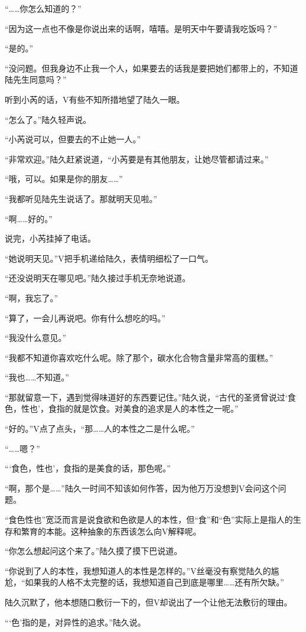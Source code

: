 “……你怎么知道的？”

“因为这一点也不像是你说出来的话啊，嘻嘻。是明天中午要请我吃饭吗？”

“是的。”

“没问题。但我身边不止我一个人，如果要去的话我是要把她们都带上的，不知道陆先生同意吗？”

听到小芮的话，V有些不知所措地望了陆久一眼。

“怎么了。”陆久轻声说。

“小芮说可以，但要去的不止她一人。”

“非常欢迎。”陆久赶紧说道，“小芮要是有其他朋友，让她尽管都请过来。”

“哦，可以。如果是你的朋友……”

“我都听见陆先生说话了。那就明天见啦。”

“啊……好的。”

说完，小芮挂掉了电话。

“她说明天见。”V把手机递给陆久，表情明细松了一口气。

“还没说明天在哪见吧。”陆久接过手机无奈地说道。

“啊，我忘了。”

“算了，一会儿再说吧。你有什么想吃的吗。”

“我没什么意见。” 

“我都不知道你喜欢吃什么呢。除了那个，碳水化合物含量非常高的蛋糕。”

“我也……不知道。”

“那就留意一下，遇到觉得味道好的东西要记住。”陆久说，“古代的圣贤曾说过‘食色，性也’，食指的就是饮食。对美食的追求是人的本性之一呢。”

“好的。”V点了点头，“那……人的本性之二是什么呢。”

“……嗯？”

“‘食色，性也’，食指的是美食的话，那色呢。”

“啊，那个是……”陆久一时间不知该如何作答，因为他万万没想到V会问这个问题。

“食色性也”宽泛而言是说食欲和色欲是人的本性，但“食”和“色”实际上是指人的生存和繁育的本能。这种抽象的东西该怎么向V解释呢。

“你怎么想起问这个来了。”陆久摸了摸下巴说道。

“你说到了人的本性，我想知道人的本性是怎样的。”V丝毫没有察觉陆久的尴尬，“如果我的人格不太完整的话，我想知道自己到底是哪里……还有所欠缺。”

陆久沉默了，他本想随口敷衍一下的，但V却说出了一个让他无法敷衍的理由。

“‘色’指的是，对异性的追求。”陆久说。

